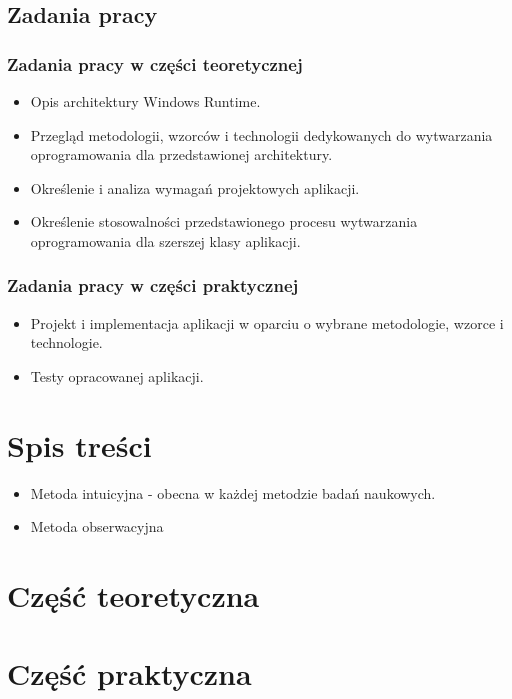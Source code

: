 \documentclass{beamer}
\begin{document}
\begin{frame}
\section{Zadania pracy}
\frametitle{Zadania pracy w części teoretycznej}
\begin{itemize}
\item Opis architektury Windows Runtime.
\item Przegląd metodologii, wzorców i technologii dedykowanych do wytwarzania oprogramowania dla przedstawionej architektury.
\item Określenie i analiza wymagań projektowych aplikacji.
\item Określenie stosowalności przedstawionego procesu wytwarzania oprogramowania dla szerszej klasy aplikacji.
\end{itemize} 
\end{frame}


\begin{frame}
\frametitle{Zadania pracy w części praktycznej}
\begin{itemize}
\item  Projekt i implementacja aplikacji w oparciu o wybrane metodologie, wzorce i technologie.
\item Testy opracowanej aplikacji. 
\end{itemize}
\end{frame}


\section{Spis treści}



\begin{frame}
\begin{itemize}
\frametitle{Metoda badawcza}
\item Metoda intuicyjna - obecna w każdej metodzie badań naukowych. 
\item Metoda obserwacyjna
\end{itemize}
\end{frame}

\section{Część teoretyczna}


\section{Część praktyczna}

\end{document}
